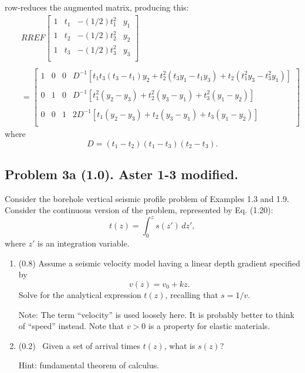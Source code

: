 \documentclass[11pt,titlepage,fleqn]{article}
\begin{document}
\noindent
row-reduces the augmented matrix, producing this:
%
\begin{eqnarray}
&& RREF \left[
\begin{array}{cccc}
1 & t_1 & -(1/2)t_1^2 & y_1 \\
1 & t_2 & -(1/2)t_2^2 & y_2 \\
1 & t_3 & -(1/2)t_3^2 & y_3 \\
\end{array}
\right]
\nonumber \\ \nonumber \\
&& =
\left[
\begin{array}{cccc}
1 & 0 & 0 & D^{-1}\left[t_1 t_3(t_3-t_1)y_2 + t_2^2(t_3 y_1 - t_1 y_3) + t_2(t_1^2 y_3 - t_3^2 y_1) \right] \\
& & & \\
0 & 1 & 0 & D^{-1}\left[ t_1^2(y_2-y_3) + t_2^2(y_3 -y_1) + t_3^2(y_1-y_2)\right] \\
& & & \\
0 & 0 & 1 & 2D^{-1}\left[ t_1(y_2-y_3) + t_2(y_3 -y_1) + t_3(y_1-y_2)\right] \\
\end{array}
\right]
\label{rref}
\end{eqnarray}
%
where
%
\begin{equation}
D = (t_1-t_2)(t_1-t_3)(t_2-t_3).
\end{equation}


\subsection*{Problem 3a (1.0). Aster 1-3 modified.}

Consider the borehole vertical seismic profile problem of Examples 1.3 and 1.9. Consider the continuous version of the problem, represented by Eq. (1.20):
%
\begin{equation}
t(z) = \int_0^z s(z')\,dz',
\label{tz}
\end{equation}
%
where $z'$ is an integration variable.

\begin{enumerate}

\item (0.8) Assume a seismic velocity model having a linear depth gradient specified by
%
\begin{equation}
v(z) = v_0 + kz.
\label{vz}
\end{equation}
%
Solve for the analytical expression $t(z)$, recalling that $s = 1/v$.

Note: The term ``velocity'' is used loosely here. It is probably better to think of ``speed'' instead. Note that $v > 0$ is a property for elastic materials.


\item (0.2) \ptag\ Given a set of arrival times $t(z)$, what is $s(z)$?

Hint: fundamental theorem of calculus.

\end{enumerate}
\end{document}

